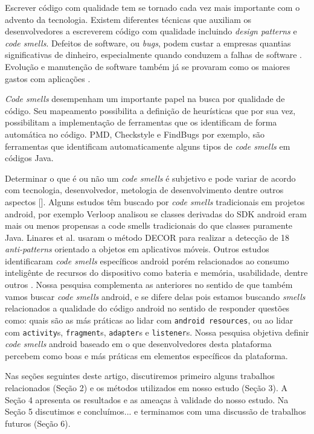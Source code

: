 Escrever c\'odigo com qualidade tem se tornado cada vez mais importante com o advento da tecnologia. Existem diferentes t\'ecnicas que auxiliam os desenvolvedores a escreverem c\'odigo com qualidade incluindo \textit{design patterns} e \textit{code smells}. Defeitos de software, ou \textit{bugs}, podem custar a empresas quantias significativas de dinheiro, especialmente quando conduzem a falhas de software \cite{Nagappan:2005, briand1993modeling}. Evolu\c{c}\~ao e manuten\c{c}\~ao de software tamb\'em j\'a se provaram como os maiores gastos com aplica\c{c}\~oes \cite{RefactoringAndImprovements:10}.

\textit{Code smells} desempenham um importante papel na busca por qualidade de c\'odigo. Seu mapeamento possibilita a defini\c{c}\~ao de heur\'isticas que por sua vez, possibilitam a implementa\c{c}\~ao de ferramentas que os identificam de forma autom\'atica no c\'odigo. PMD, Checkstyle e FindBugs por exemplo, s\~ao ferramentas que identificam automaticamente alguns tipos de \textit{code smells} em c\'odigos Java.

Determinar o que \'e ou n\~ao um \textit{code smells} \'e subjetivo e pode variar de acordo com tecnologia, desenvolvedor, metologia de desenvolvimento dentre outros aspectos []. Alguns estudos t\^em buscado por \textit{code smells} tradicionais em projetos android, por exemplo Verloop \cite{MobileSmells:13} analisou se classes derivadas do SDK android eram mais ou menos propensas a code smells tradicionais do que classes puramente Java. Linares et al. \cite{DomainMatters} usaram o m\'etodo DECOR para realizar a detec\c{c}\~ao de 18 \textit{anti-patterns} orientado a objetos em aplicativos m\'oveis. Outros estudos identificaram \textit{code smells} espec\'ificos android porém relacionados ao consumo intelig\^ente de recursos do dispositivo como bateria e mem\'oria, usabilidade, dentre outros \cite{EnergyAndroidSmells, ReimannBrylski2013}. Nossa pesquisa complementa as anteriores no sentido de que tamb\'em vamos buscar \textit{code smells} android, e se difere delas pois estamos buscando \textit{smells} relacionados a qualidade do c\'odigo android no sentido de responder quest\~oes como: quais s\~ao as m\'as pr\'aticas ao lidar com \texttt{android resources}, ou ao lidar com \texttt{activity}s, \texttt{fragment}s, \texttt{adapter}s e \texttt{listener}s. Nossa pesquisa objetiva definir \textit{code smells} android baseado em o que desenvolvedores desta plataforma percebem como boas e m\'as pr\'aticas em elementos espec\'ificos da plataforma.

Nas se\c{c}\~oes seguintes deste artigo, discutiremos primeiro alguns trabalhos relacionados (Se\c{c}\~ao 2) e os m\'etodos utilizados em nosso estudo (Se\c{c}\~ao 3). A Se\c{c}\~ao 4 apresenta os resultados e as amea\c{c}as \`a validade do nosso estudo. Na Se\c{c}\~ao 5 discutimos e conclu\'imos... e terminamos com uma discuss\~ao de trabalhos futuros (Se\c{c}\~ao 6).
